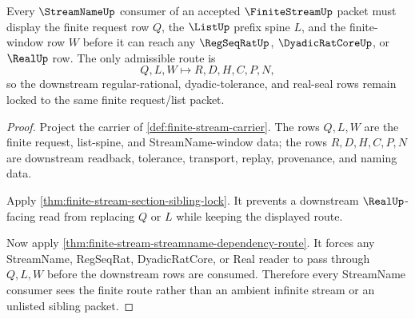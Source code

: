 \begin{theorem}
\label{thm:finite-stream-streamname-route}
Every $\StreamNameUp$ consumer of an accepted $\FiniteStreamUp$ packet must display the finite request row $Q$, the $\ListUp$ prefix spine $L$, and the finite-window row $W$ before it can reach any $\RegSeqRatUp$, $\DyadicRatCoreUp$, or $\RealUp$ row. The only admissible route is
$$
Q,L,W \longmapsto R,D,H,C,P,N,
$$
so the downstream regular-rational, dyadic-tolerance, and real-seal rows remain locked to the same finite request/list packet.
\end{theorem}
\begin{proof}
Project the carrier of \autoref{def:finite-stream-carrier}. The rows $Q,L,W$ are the finite request, list-spine, and StreamName-window data; the rows $R,D,H,C,P,N$ are downstream readback, tolerance, transport, replay, provenance, and naming data.

Apply \autoref{thm:finite-stream-section-sibling-lock}. It prevents a downstream $\RealUp$-facing read from replacing $Q$ or $L$ while keeping the displayed route.

Now apply \autoref{thm:finite-stream-streamname-dependency-route}. It forces any StreamName, RegSeqRat, DyadicRatCore, or Real reader to pass through $Q,L,W$ before the downstream rows are consumed. Therefore every StreamName consumer sees the finite route rather than an ambient infinite stream or an unlisted sibling packet.
\end{proof}

